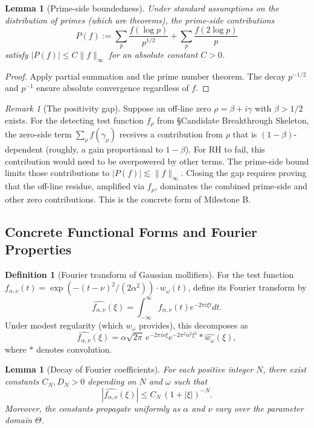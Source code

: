 \documentclass[11pt]{article}
\theoremstyle{plain}
\newtheorem{lemma}[theorem]{Lemma}
\theoremstyle{definition}
\newtheorem{definition}[theorem]{Definition}
\theoremstyle{remark}
\newtheorem{remark}[theorem]{Remark}
\begin{document}
\begin{lemma}[Prime-side boundedness]
Under standard assumptions on the distribution of primes (which are theorems), the prime-side
contributions
\[
P(f):=\sum_p \frac{f(\log p)}{p^{1/2}} + \sum_p \frac{f(2\log p)}{p}
\]
satisfy $|P(f)|\le C\|f\|_{\infty}$ for an absolute constant $C>0$.
\end{lemma}

\begin{proof}
Apply partial summation and the prime number theorem.
The decay $p^{-1/2}$ and $p^{-1}$ ensure absolute convergence regardless of $f$.
\end{proof}

\begin{remark}[The positivity gap]
Suppose an off-line zero $\rho=\beta+i\gamma$ with $\beta>1/2$ exists.
For the detecting test function $f_\rho$ from \S Candidate Breakthrough Skeleton,
the zero-side term $\sum_\rho f(\gamma_\rho)$ receives a contribution from $\rho$ that is
$(1-\beta)$-dependent (roughly, a gain proportional to $1-\beta$).
For RH to fail, this contribution would need to be overpowered by other terms.
The prime-side bound limits those contributions to $|P(f)|\lesssim\|f\|_{\infty}$.
Closing the gap requires proving that the off-line residue, amplified via $f_\rho$,
dominates the combined prime-side and other zero contributions.
This is the concrete form of Milestone B.
\end{remark}

\subsection{Concrete Functional Forms and Fourier Properties}

\begin{definition}[Fourier transform of Gaussian mollifiers]
For the test function $f_{\alpha,\nu}(t)=\exp(-(t-\nu)^2/(2\alpha^2))\cdot w_\omega(t)$, define its
Fourier transform by
\[
\widehat{f_{\alpha,\nu}}(\xi) = \int_{-\infty}^{\infty} f_{\alpha,\nu}(t) e^{-2\pi i \xi t} dt.
\]
Under modest regularity (which $w_\omega$ provides), this decomposes as
\[
\widehat{f_{\alpha,\nu}}(\xi) = \alpha\sqrt{2\pi} \, e^{-2\pi i \nu\xi} e^{-2\pi^2\alpha^2\xi^2} \ast \widehat{w_\omega}(\xi),
\]
where $\ast$ denotes convolution.
\end{definition}

\begin{lemma}[Decay of Fourier coefficients]
For each positive integer $N$, there exist constants $C_N, D_N>0$ depending on $N$ and $\omega$ such that
\[
|\widehat{f_{\alpha,\nu}}(\xi)| \le C_N \, (1+|\xi|)^{-N}.
\]
Moreover, the constants propagate uniformly as $\alpha$ and $\nu$ vary over the parameter domain $\Theta$.
\end{lemma}
\end{document}
